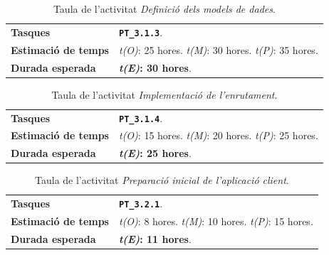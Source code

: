 \documentclass[a4paper,12pt]{ThesisStyle}
\begin{document}
\begin{table}[H]
  \begin{tabularx}{\textwidth}{l | X}
    \toprule
    \rowcolor{Blue}
    \multicolumn{2}{c}{\texttt{\textbf{A8:}} Definició dels models de dades}\\
    \midrule[0.9pt]
    \textbf{Tasques}                 & \texttt{\textbf{PT\_3.1.3}}.\\
    \midrule
    \textbf{Estimació de temps}      & \textit{t(O)}: 25 hores.
    \newline \textit{t(M)}: 30 hores.
    \newline \textit{t(P)}: 35 hores.\\
    \midrule
    \textbf{Durada esperada}         & \textbf{\textit{t(E)}: 30 hores}.\\
    \bottomrule
  \end{tabularx}
  \caption{\label{taula:a8} Taula de l'activitat \emph{Definició dels models de dades}.}
\end{table}

\begin{table}[H]
  \begin{tabularx}{\textwidth}{l | X}
    \toprule
    \rowcolor{Blue}
    \multicolumn{2}{c}{\texttt{\textbf{A9:}} Implementació de l'enrutament}\\
    \midrule[0.9pt]
    \textbf{Tasques}                 & \texttt{\textbf{PT\_3.1.4}}.\\
    \midrule
    \textbf{Estimació de temps}      & \textit{t(O)}: 15 hores.
    \newline \textit{t(M)}: 20 hores.
    \newline \textit{t(P)}: 25 hores.\\
    \midrule
    \textbf{Durada esperada}         & \textbf{\textit{t(E)}: 25 hores}.\\
    \bottomrule
  \end{tabularx}
  \caption{\label{taula:a9} Taula de l'activitat \emph{Implementació de l'enrutament}.}
\end{table}

\begin{table}[H]
  \begin{tabularx}{\textwidth}{l | X}
    \toprule
    \rowcolor{Blue}
    \multicolumn{2}{c}{\texttt{\textbf{A10:}} Preparació inicial de l'aplicació client}\\
    \midrule[0.9pt]
    \textbf{Tasques}                 & \texttt{\textbf{PT\_3.2.1}}.\\
    \midrule
    \textbf{Estimació de temps}      & \textit{t(O)}: 8 hores.
    \newline \textit{t(M)}: 10 hores.
    \newline \textit{t(P)}: 15 hores.\\
    \midrule
    \textbf{Durada esperada}         & \textbf{\textit{t(E)}: 11 hores}.\\
    \bottomrule
  \end{tabularx}
  \caption{\label{taula:a10} Taula de l'activitat \emph{Preparació inicial de l'aplicació client}.}
\end{table}
\end{document}

